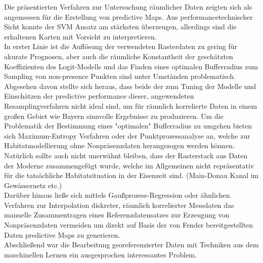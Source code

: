 Die präsentierten Verfahren zur Untersuchung räumlicher Daten zeigten sich als angemessen für die Erstellung von predictive Maps. Aus performancetechnischer Sicht konnte der SVM Ansatz am stärksten überzeugen, allerdings sind die erhaltenen Karten mit Vorsicht zu interpretieren. \\ In erster Linie ist die Auflösung der verwendeten Rasterdaten zu gering für akurate Prognosen, aber auch die räumliche Konstantheit der geschätzten Koeffizienten des Logit-Modells und das Finden eines optimalen Bufferradius zum Sampling von non-presence Punkten sind unter Umständen problematisch. Abgesehen davon stellte sich heraus, dass beide der zum Tuning der Modelle und Einschätzen der predictive performance dieser, angewendeten Resamplingverfahren nicht ideal sind, um für räumlich korrelierte Daten in einem großen Gebiet wie Bayern sinnvolle Ergebnisse zu produzieren.  
Um die Problematik der Bestimmung eines "optimalen" Bufferradius zu umgehen bieten sich Maximum-Entropy Verfahren \cite{phillips2006maximum} oder der Punktprozessanalyse  an, welche zur Habitatmodellierung ohne Nonpräsenzdaten herangezogen werden können.\\
Natürlich sollte auch nicht unerwähnt bleiben, dass der Rasterstack aus Daten der Moderne zusammengefügt wurde, welche im Allgemeinen nicht repräsentativ für die tatsächliche Habitatsituation in der Eisenzeit sind. (Main-Donau Kanal im Gewässernetz etc.) \\
Darüber hinaus ließe sich mittels Gaußprozess-Regression \cite{gaussprozess} oder ähnlichen Verfahren zur Interpolation diskreter, räumlich korrelierter Messdaten das manuelle Zusammentragen eines Referenzdatensatzes zur Erzeugung von Nonpräsenzdaten vermeiden um direkt auf Basis der von Fender bereitgestellten Daten predictive Maps zu generieren. \\
Abschließend war die Bearbeitung georeferenzierter Daten mit Techniken aus dem maschinellen Lernen ein ausgesprochen interessantes Problem. 